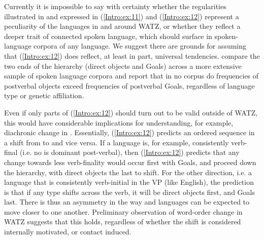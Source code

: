 \documentclass[output=paper,colorlinks,citecolor=brown,collectionchapter]{langscibook}
\begin{document}
Currently it is impossible to say with certainty whether the regularities illustrated in  and expressed in (\ref{Intro:ex:11}) and (\ref{Intro:ex:12}) represent a peculiarity of the languages in and around WATZ, or whether they reflect a deeper trait of connected spoken language, which should surface in spoken-language corpora of any language. We suggest there are grounds for assuming that (\ref{Intro:ex:12}) does reflect, at least in part, universal tendencies. \citet{haig_goals_2023} compare the two ends of the hierarchy (direct objects and Goals) across a more extensive sample of spoken language corpora and report that in no corpus do frequencies of postverbal objects exceed frequencies of postverbal Goals, regardless of language type or genetic affiliation.

\begin{sloppypar}
Even if only parts of (\ref{Intro:ex:12}) should turn out to be valid outside of WATZ, this would have considerable implications for understanding, for example, diachronic change in . Essentially, (\ref{Intro:ex:12}) predicts an ordered sequence in a shift from  to  and vice versa. If a language is, for example, consistently verb-final (i.e. no  is dominant post-verbal), then (\ref{Intro:ex:12}) predicts that any change towards less verb-finality would occur first with Goals, and proceed down the hierarchy, with direct objects the last to shift. For the other direction, i.e. a language that is consistently verb-initial in the VP (like English), the prediction is that if any  type shifts across the verb, it will be direct objects first, and Goals last. There is thus an asymmetry in the way  and  languages can be expected to move closer to one another. Preliminary observation of word-order change in WATZ suggests that this holds, regardless of whether the shift is considered internally motivated, or contact induced.
\end{sloppypar}
\end{document}
